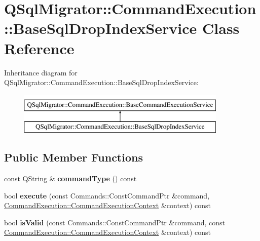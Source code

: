 \hypertarget{class_q_sql_migrator_1_1_command_execution_1_1_base_sql_drop_index_service}{}\section{Q\+Sql\+Migrator\+:\+:Command\+Execution\+:\+:Base\+Sql\+Drop\+Index\+Service Class Reference}
\label{class_q_sql_migrator_1_1_command_execution_1_1_base_sql_drop_index_service}
Inheritance diagram for Q\+Sql\+Migrator\+:\+:Command\+Execution\+:\+:Base\+Sql\+Drop\+Index\+Service\+:\begin{figure}[H]
\begin{center}
\leavevmode
\includegraphics[height=2.000000cm]{class_q_sql_migrator_1_1_command_execution_1_1_base_sql_drop_index_service}
\end{center}
\end{figure}
\subsection*{Public Member Functions}
\begin{DoxyCompactItemize}
\item 
\mbox{\label{class_q_sql_migrator_1_1_command_execution_1_1_base_sql_drop_index_service_a208d57d394b2793195621af8d9818659}} 
const Q\+String \& {\bfseries command\+Type} () const
\item 
\mbox{\label{class_q_sql_migrator_1_1_command_execution_1_1_base_sql_drop_index_service_a47487ffd6254eaaa5696b5ccf307e4cf}} 
bool {\bfseries execute} (const Commands\+::\+Const\+Command\+Ptr \&command, \hyperlink{class_q_sql_migrator_1_1_command_execution_1_1_command_execution_context}{Command\+Execution\+::\+Command\+Execution\+Context} \&context) const
\item 
\mbox{\label{class_q_sql_migrator_1_1_command_execution_1_1_base_sql_drop_index_service_a729542b61bc3a2f7bb0c55cca39ea6ea}} 
bool {\bfseries is\+Valid} (const Commands\+::\+Const\+Command\+Ptr \&command, const \hyperlink{class_q_sql_migrator_1_1_command_execution_1_1_command_execution_context}{Command\+Execution\+::\+Command\+Execution\+Context} \&context) const
\end{DoxyCompactItemize}
